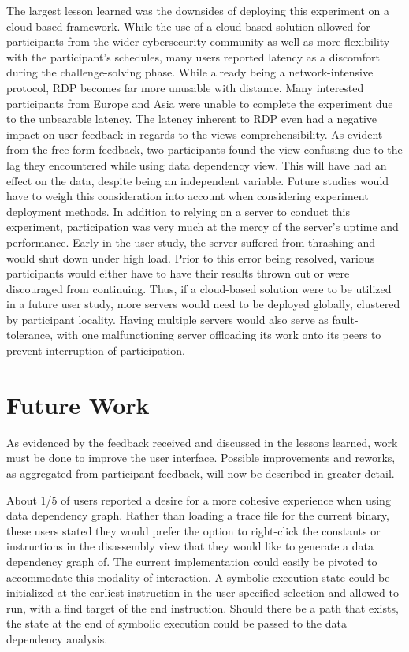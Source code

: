 The largest lesson learned was the downsides of deploying this experiment on a cloud-based framework. While the use of a cloud-based solution allowed for participants from the wider cybersecurity community as well as more flexibility with the participant’s schedules, many users reported latency as a discomfort during the challenge-solving phase. While already being a network-intensive protocol, RDP becomes far more unusable with distance. Many interested participants from Europe and Asia were unable to complete the experiment due to the unbearable latency. The latency inherent to RDP even had a negative impact on user feedback in regards to the views comprehensibility. As evident from the free-form feedback, two participants found the view confusing due to the lag they encountered while using data dependency view. This will have had an effect on the data, despite being an independent variable. Future studies would have to weigh this consideration into account when considering experiment deployment methods.
In addition to relying on a server to conduct this experiment, participation was very much at the mercy of the server’s uptime and performance. Early in the user study, the server suffered from thrashing and would shut down under high load. Prior to this error being resolved, various participants would either have to have their results thrown out or were discouraged from continuing. Thus, if a cloud-based solution were to be utilized in a future user study, more servers would need to be deployed globally, clustered by participant locality. Having multiple servers would also serve as fault-tolerance, with one malfunctioning server offloading its work onto its peers to prevent interruption of participation.

\section{Future Work}
As evidenced by the feedback received and discussed in the lessons learned, work must be done to improve the user interface. Possible improvements and reworks, as aggregated from participant feedback, will now be described in greater detail. 

About 1/5 of users reported a desire for a more cohesive experience when using data dependency graph. Rather than loading a trace file for the current binary, these users stated they would prefer the option to right-click the constants or instructions in the disassembly view that they would like to generate a data dependency graph of. The current implementation could easily be pivoted to accommodate this modality of interaction. A symbolic execution state could be initialized at the earliest instruction in the user-specified selection and allowed to run, with a find target of the end instruction. Should there be a path that exists, the state at the end of symbolic execution could be passed to the data dependency analysis.

